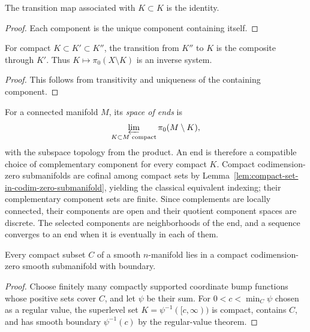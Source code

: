 \begin{lemma}
\label{lem:ends-transition-id}
\leanok



The transition map associated with $K\subset K$ is the identity.
\end{lemma}
\begin{proof}
\sketch
\leanok
Each component is the unique component containing itself.
\end{proof}

\begin{lemma}
\label{lem:ends-transition-comp}
\leanok



For compact $K\subset K'\subset K''$, the transition from $K''$ to
$K$ is the composite through $K'$. Thus $K\mapsto\pi_0(X\setminus K)$
is an inverse system.
\end{lemma}
\begin{proof}
\sketch
\leanok
This follows from transitivity and uniqueness of the containing
component.
\end{proof}

\begin{definition}
\label{def:space-of-ends}





For a connected manifold $M$, its \emph{space of ends} is
$$\varprojlim_{K\subset M\text{ compact}}\pi_0(M\setminus K),$$
with the subspace topology from the product. An end is therefore a
compatible choice of complementary component for every compact $K$.
Compact codimension-zero submanifolds are cofinal among compact sets by
Lemma~\ref{lem:compact-set-in-codim-zero-submanifold}, yielding the
classical equivalent indexing; their complementary component sets are
finite. Since complements are locally connected, their components are
open and their quotient component spaces are discrete. The selected
components are neighborhoods of the end, and a sequence converges to an
end when it is eventually in each of them.
\end{definition}

\begin{lemma}
\label{lem:compact-set-in-codim-zero-submanifold}
Every compact subset $C$ of a smooth $n$-manifold lies in a compact
codimension-zero smooth submanifold with boundary.
\end{lemma}
\begin{proof}
\sketch
Choose finitely many compactly supported coordinate bump functions whose
positive sets cover $C$, and let $\psi$ be their sum. For
$0<c<\min_C\psi$ chosen as a regular value, the superlevel set
$K=\psi^{-1}([c,\infty))$ is compact, contains $C$, and has smooth
boundary $\psi^{-1}(c)$ by the regular-value theorem.
\end{proof}

